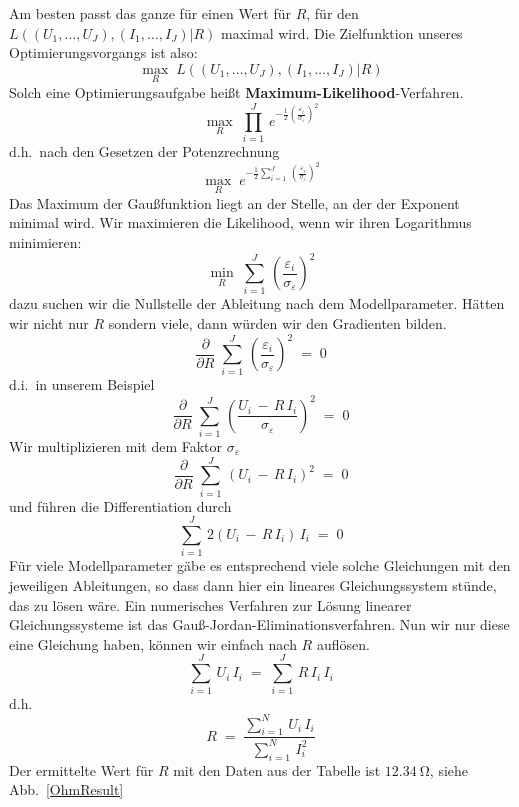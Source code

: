 \documentclass[a4paper,12pt,DIV=15]{scrartcl}
\begin{document}
Am besten passt das ganze für einen Wert für $R$,
für den $L((U_1,\dots, U_J), (I_1,\dots,I_J) | R)$ maximal wird.
Die Zielfunktion unseres Optimierungsvorgangs ist also:
\begin{equation}
\max_{R} \; L((U_1,\dots, U_J), (I_1,\dots,I_J) | R)
\end{equation}
Solch eine Optimierungsaufgabe heißt \textbf{Maximum-Likelihood}-Verfahren.
\begin{equation}
\max_{R} \; \prod\limits_{i = 1}^J \,  e^{-\frac{1}{2} \left(\frac{\varepsilon_i}{\sigma_\varepsilon}\right)^2}
\end{equation}
d.h.\ nach den Gesetzen der Potenzrechnung
\begin{equation}
\max_{R} \; e^{-\frac{1}{2} \sum\limits_{i = 1}^J \, \left(\frac{\varepsilon_i}{\sigma_\varepsilon}\right)^2}
\end{equation}
Das Maximum der Gaußfunktion liegt an der Stelle, an der der Exponent minimal wird.
Wir maximieren die Likelihood, wenn wir ihren Logarithmus minimieren:
\begin{equation}
\min_{R} \; \sum_{i = 1}^J \, \left(\frac{\varepsilon_i}{\sigma_\varepsilon}\right)^2
\end{equation}
dazu suchen wir die Nullstelle der Ableitung nach dem Modellparameter. Hätten wir nicht nur $R$ sondern viele,
dann würden wir den Gradienten bilden.
\begin{equation}
\frac{\partial}{\partial R} \; \sum_{i = 1}^J \, \left(\frac{\varepsilon_i}{\sigma_\varepsilon}\right)^2 \; = \; 0
\end{equation}
d.i.\ in unserem Beispiel
\begin{equation}
\frac{\partial}{\partial R} \; \sum_{i = 1}^J \, \left(\frac{U_i \, - \, R \, I_i}{\sigma_\varepsilon}\right)^2 \; = \; 0
\end{equation}
Wir multiplizieren mit dem Faktor $\sigma_\varepsilon$
\begin{equation}
\frac{\partial}{\partial R} \; \sum_{i = 1}^J \, \left(U_i \, - \, R \, I_i\right)^2 \; = \; 0
\end{equation}
und führen die Differentiation durch
\begin{equation}
\sum_{i = 1}^J \, 2 \left(U_i \, - \, R \, I_i\right) \, I_i \; = \; 0
\end{equation}
Für viele Modellparameter gäbe es entsprechend viele solche Gleichungen mit den jeweiligen Ableitungen, so dass
dann hier ein lineares Gleichungssystem stünde, das zu lösen wäre.
Ein numerisches Verfahren zur Lösung linearer Gleichungssysteme ist das Gauß-Jordan-Eliminationsverfahren.
Nun wir nur diese eine Gleichung haben, können wir einfach nach $R$ auflösen.
\begin{equation}
\sum_{i = 1}^J \, U_i \, I_i \; = \; \sum_{i = 1}^J \, R \, I_i \, I_i
\end{equation}
d.h.
\begin{equation}
 R \; = \; \frac{\sum\limits_{i = 1}^N \, U_i \, I_i}{\sum\limits_{i = 1}^N \,  I_i^2}
\end{equation}
Der ermittelte Wert für $R$ mit den Daten aus der Tabelle ist $12.34~\mathrm{\Omega}$, siehe Abb.~\ref{OhmResult}
\end{document}
